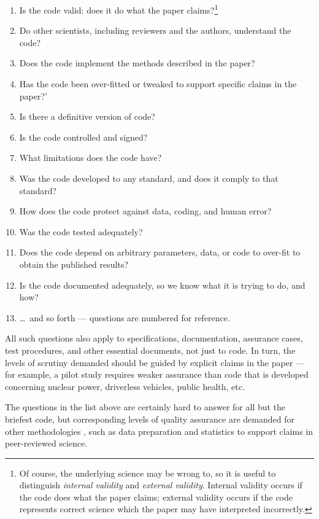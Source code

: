 \documentclass{comjnl}
\begin{document}
\newcount \enum
{}
\renewcommand{\theenumi}{\ifnum \enum<10 \hphantom{0}\fi
\the\enum
\global\advance \enum by 1}
\begin{enumerate}\raggedright
\item Is the code valid: does it do what the paper claims?\footnote{Of course, the underlying science may be wrong to, so it is useful to distinguish \emph{internal validity\/} and \emph{external validity}. Internal validity occurs if the code does what the paper claims; external validity occurs if the code represents correct science which the paper may have interpreted incorrectly.}
\item Do other scientists, including reviewers and the authors, understand the code?
\item Does the code implement the methods described in the paper?
\item Has the code been over-fitted or tweaked to support specific claims in the paper?'
\item Is there a definitive version of code?
\item Is the code controlled and signed?
\item What limitations does the code have?
\item Was the code developed to any standard, and does it comply to that standard?
\item How does the code protect against data, coding, and human error?
\item Was the code tested adequately?
\item Does the code depend on arbitrary parameters, data, or code to over-fit to obtain the published results?
\item Is the code documented adequately, so we know what it is trying to do, and how?
\item \ldots\ and so forth --- questions are numbered for reference. 
\end{enumerate}

All such questions also apply to specifications, documentation, assurance cases, test procedures, and other essential documents, not just to code. In turn, the levels of scrutiny demanded should be guided by explicit claims in the paper \cite{essence-of-software} --- for example, a pilot study requires weaker assurance than code that is developed concerning nuclear power, driverless vehicles, public health, etc. 

The questions in the list above are certainly hard to answer for all but the briefest code, but corresponding levels of quality assurance are demanded for other methodologies \cite{notebooks,popper-conjectures-refutations,tripod,prisma,nih-policy,nih-nature}, such as data preparation and statistics to support claims in peer-reviewed science. 
\end{document}
